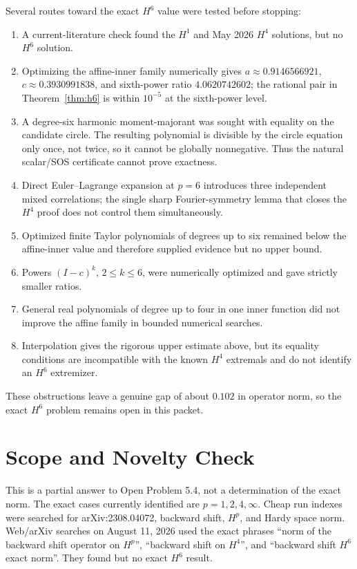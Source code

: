 \documentclass[11pt]{article}
\begin{document}
Several routes toward the exact $H^6$ value were tested before stopping:
\begin{enumerate}
\item A current-literature check found the $H^1$ and May 2026 $H^4$ solutions,
but no $H^6$ solution.
\item Optimizing the affine-inner family numerically gives
$a\approx0.9146566921$, $c\approx0.3930991838$, and sixth-power ratio
$4.0620742602$; the rational pair in Theorem~\ref{thm:h6} is within
$10^{-5}$ at the sixth-power level.
\item A degree-six harmonic moment-majorant was sought with equality on the
candidate circle.  The resulting polynomial is divisible by the circle
equation only once, not twice, so it cannot be globally nonnegative.  Thus the
natural scalar/SOS certificate cannot prove exactness.
\item Direct Euler--Lagrange expansion at $p=6$ introduces three independent
mixed correlations; the single sharp Fourier-symmetry lemma that closes the
$H^4$ proof does not control them simultaneously.
\item Optimized finite Taylor polynomials of degrees up to six remained below
the affine-inner value and therefore supplied evidence but no upper bound.
\item Powers $(I-c)^k$, $2\le k\le6$, were numerically optimized and gave
strictly smaller ratios.
\item General real polynomials of degree up to four in one inner function did
not improve the affine family in bounded numerical searches.
\item Interpolation gives the rigorous upper estimate above, but its equality
conditions are incompatible with the known $H^4$ extremals and do not identify
an $H^6$ extremizer.
\end{enumerate}
These obstructions leave a genuine gap of about $0.102$ in operator norm, so
the exact $H^6$ problem remains open in this packet.

\section*{Scope and Novelty Check}

This is a partial answer to Open Problem 5.4, not a determination of the exact
norm.  The exact cases currently identified are $p=1,2,4,\infty$.  Cheap run
indexes were searched for arXiv:2308.04072, backward shift, $H^p$, and Hardy
space norm.  Web/arXiv searches on August 11, 2026 used the exact phrases
``norm of the backward shift operator on $H^p$'', ``backward shift on $H^4$'',
and ``backward shift $H^6$ exact norm''.  They found \cite{BS,BL} but no exact
$H^6$ result.
\end{document}
